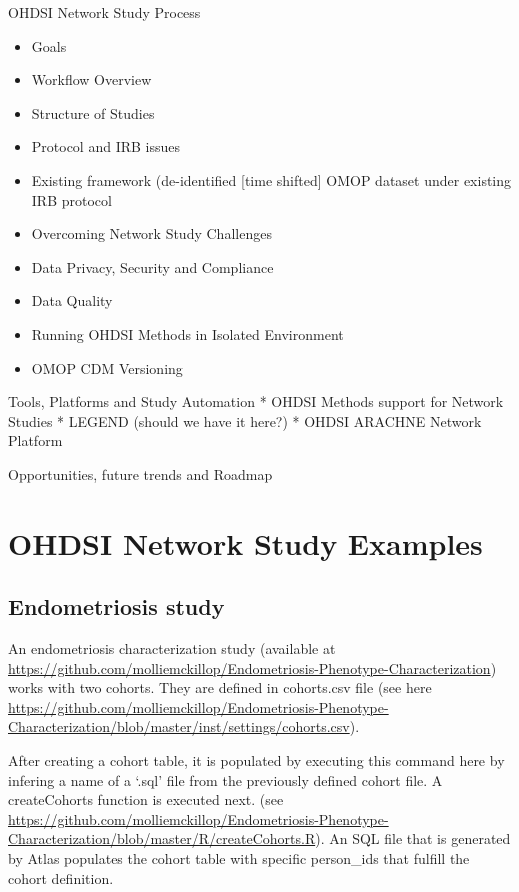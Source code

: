 \documentclass[]{book}
\providecommand{\tightlist}{%
  \setlength{\itemsep}{0pt}\setlength{\parskip}{0pt}}
\begin{document}
OHDSI Network Study Process

\begin{itemize}
\tightlist
\item
  Goals
\item
  Workflow Overview
\item
  Structure of Studies
\item
  Protocol and IRB issues
\item
  Existing framework (de-identified {[}time shifted{]} OMOP dataset
  under existing IRB protocol
\item
  Overcoming Network Study Challenges
\item
  Data Privacy, Security and Compliance
\item
  Data Quality
\item
  Running OHDSI Methods in Isolated Environment
\item
  OMOP CDM Versioning
\end{itemize}

Tools, Platforms and Study Automation * OHDSI Methods support for
Network Studies * LEGEND (should we have it here?) * OHDSI ARACHNE
Network Platform

Opportunities, future trends and Roadmap

\section{OHDSI Network Study
Examples}\label{ohdsi-network-study-examples}

\subsection{Endometriosis study}\label{endometriosis-study}

An endometriosis characterization study (available at
\url{https://github.com/molliemckillop/Endometriosis-Phenotype-Characterization})
works with two cohorts. They are defined in cohorts.csv file (see here
\url{https://github.com/molliemckillop/Endometriosis-Phenotype-Characterization/blob/master/inst/settings/cohorts.csv}).

After creating a cohort table, it is populated by executing this command
here by infering a name of a `.sql' file from the previously defined
cohort file. A createCohorts function is executed next. (see
\url{https://github.com/molliemckillop/Endometriosis-Phenotype-Characterization/blob/master/R/createCohorts.R}).
An SQL file that is generated by Atlas populates the cohort table with
specific person\_ids that fulfill the cohort definition.
\end{document}

